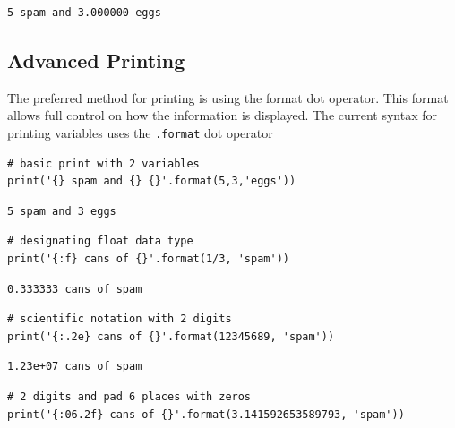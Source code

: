 \documentclass[%
oneside,                 %
final,                   %
10pt]{article}
\begin{document}
\begin{Verbatim}[numbers=none,fontsize=\fontsize{9pt}{9pt},baselinestretch=0.95,xleftmargin=2mm]
5 spam and 3.000000 eggs
\end{Verbatim}

\subsection{Advanced Printing}

The preferred method for printing is using the format dot operator. This format allows full control on how the information is displayed. The current syntax for printing variables uses the \texttt{.format} dot operator


\begin{Verbatim}[numbers=none,fontsize=\fontsize{9pt}{9pt},baselinestretch=0.95,xleftmargin=2mm]
# basic print with 2 variables
print('{} spam and {} {}'.format(5,3,'eggs'))
\end{Verbatim}

\begin{Verbatim}[numbers=none,fontsize=\fontsize{9pt}{9pt},baselinestretch=0.95,xleftmargin=2mm]
5 spam and 3 eggs
\end{Verbatim}


\begin{Verbatim}[numbers=none,fontsize=\fontsize{9pt}{9pt},baselinestretch=0.95,xleftmargin=2mm]
# designating float data type
print('{:f} cans of {}'.format(1/3, 'spam'))
\end{Verbatim}

\begin{Verbatim}[numbers=none,fontsize=\fontsize{9pt}{9pt},baselinestretch=0.95,xleftmargin=2mm]
0.333333 cans of spam
\end{Verbatim}


\begin{Verbatim}[numbers=none,fontsize=\fontsize{9pt}{9pt},baselinestretch=0.95,xleftmargin=2mm]
# scientific notation with 2 digits
print('{:.2e} cans of {}'.format(12345689, 'spam'))
\end{Verbatim}

\begin{Verbatim}[numbers=none,fontsize=\fontsize{9pt}{9pt},baselinestretch=0.95,xleftmargin=2mm]
1.23e+07 cans of spam
\end{Verbatim}


\begin{Verbatim}[numbers=none,fontsize=\fontsize{9pt}{9pt},baselinestretch=0.95,xleftmargin=2mm]
# 2 digits and pad 6 places with zeros
print('{:06.2f} cans of {}'.format(3.141592653589793, 'spam'))
\end{Verbatim}
\end{document}
